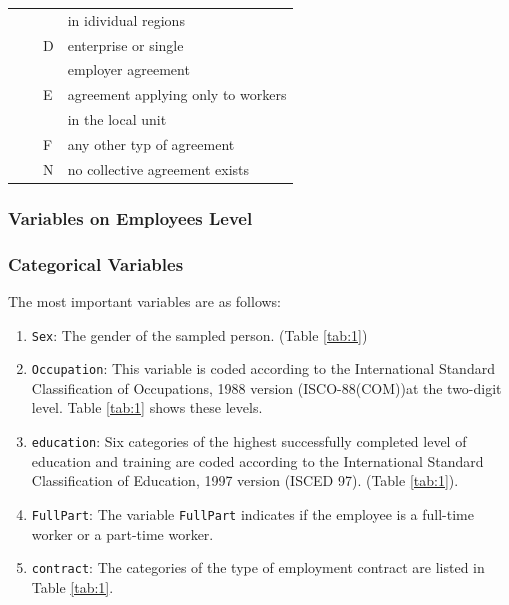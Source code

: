 \documentclass[12pt]{article}
\begin{document}
\begin{table}
\begin{center}
\begin{tabular}{|c|c|l l|}
&&& in idividual regions \\
&& D & enterprise or single \\ 
&&& employer agreement \\
&& E & agreement applying only to workers \\
&&&  in the local unit \\
&& F & any other typ of agreement \\ 
&& N & no collective agreement exists\\
\hline 
\end{tabular}
\end{center}
\label{tab:2}
\end{table}


\subsubsection{Variables on Employees Level}


\subsubsection{Categorical Variables}
The most important variables are as follows:
\begin{enumerate}
\item \texttt{Sex}: The gender of the sampled person. (Table \ref{tab:1}) 
\item \texttt{Occupation}: This variable is coded according to the International Standard Classification of Occupations, 1988 version (ISCO-88(COM))at the two-digit level. Table \ref{tab:1} shows these levels. 
\item \texttt {education}: Six categories of the highest successfully completed level of education and training are coded according to the International Standard Classification of Education, 1997 version (ISCED 97). (Table \ref{tab:1}).
\item \texttt{FullPart}: The variable \texttt{FullPart} indicates if the employee is a full-time worker or a part-time worker. 
\item \texttt{contract}: The categories of the type of employment contract are listed in Table \ref{tab:1}. 
\end{enumerate}
\end{document}
